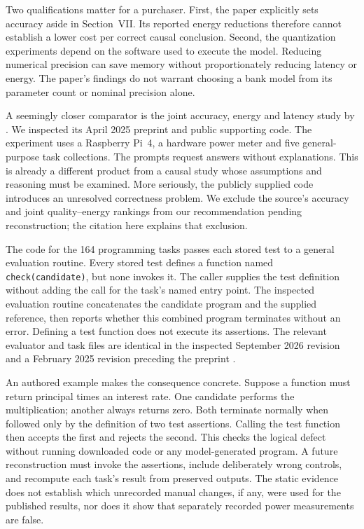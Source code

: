 Two qualifications matter for a purchaser. First, the paper explicitly sets
accuracy aside in Section~VII. Its reported energy reductions therefore
cannot establish a lower cost per correct causal conclusion. Second, the
quantization experiments depend on the software used to execute the model.
Reducing numerical precision can save memory without proportionately reducing
latency or energy. The paper's findings do not warrant choosing a bank model
from its parameter count or nominal precision alone.

A seemingly closer comparator is the joint accuracy, energy and latency
study by \citet{closureHusom2025}. We inspected its April 2025 preprint and
public supporting code. The experiment uses a Raspberry Pi~4, a hardware
power meter and five general-purpose task collections. The prompts request
answers without explanations. This is already a different product from a
causal study whose assumptions and reasoning must be examined. More seriously,
the publicly supplied code introduces an unresolved correctness problem.
We exclude the source's accuracy and joint quality--energy rankings from our
recommendation pending reconstruction; the citation here explains that
exclusion.

The code for the 164 programming tasks passes each stored test to a general
evaluation routine. Every stored test defines a function named
\texttt{check(candidate)}, but none invokes it. The caller supplies the test
definition without adding the call for the task's named entry point. The
inspected evaluation routine concatenates the candidate program and the
supplied reference, then reports whether this combined program terminates
without an error. Defining a test function does not execute its assertions.
The relevant evaluator and task files are identical in the inspected
September 2026 revision and a February 2025 revision preceding the preprint
\citep{closureEdgeCode2026,closureCodeEval2022}.

An authored example makes the consequence concrete. Suppose a function must
return principal times an interest rate. One candidate performs the
multiplication; another always returns zero. Both terminate normally when
followed only by the definition of two test assertions. Calling the test
function then accepts the first and rejects the second. This checks the
logical defect without running downloaded code or any model-generated
program. A future reconstruction must invoke the assertions, include
deliberately wrong controls, and recompute each task's result from preserved
outputs. The static evidence does not establish which unrecorded manual
changes, if any, were used for the published results, nor does it show that
separately recorded power measurements are false.

